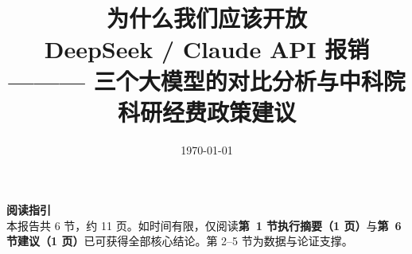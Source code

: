 \documentclass[12pt,a4paper]{ctexart}
\title{
  \vspace*{-1.5cm}
  \sffamily\color{primary}\textbf{为什么我们应该开放\\[2pt]
  DeepSeek / Claude API 报销}\\[12pt]
  \large\color{black!70}\normalfont
  ——— 三个大模型的对比分析与中科院科研经费政策建议
}
\author{}
\date{\today}
\begin{document}
\maketitle
\thispagestyle{empty}

\vfill
\begin{keypoint}
\sffamily\textbf{阅读指引}\\[3pt]
本报告共 6 节，约 11 页。如时间有限，仅阅读\textbf{第~1 节执行摘要（1 页）}与\textbf{第~6 节建议（1 页）}已可获得全部核心结论。第 2--5 节为数据与论证支撑。
\end{keypoint}
\vfill

\newpage
\setcounter{page}{1}












\end{document}
